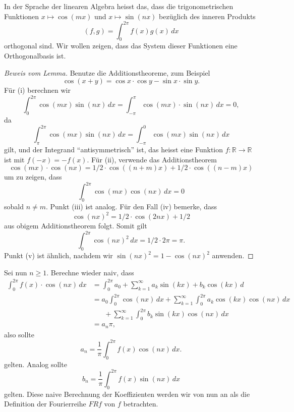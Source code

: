 \documentclass[../main.tex]{subfiles}
\begin{document}
In der Sprache der linearen Algebra 
heisst das, dass die trigonometrischen Funktionen
$x \mapsto \cos(mx)$ und $x \mapsto \sin(nx)$
bezüglich des inneren Produkts
\[
  (f, g) = \int_{0}^{2\pi} f(x) g(x) \, dx
\]
orthogonal sind.
Wir wollen zeigen, dass das System dieser Funktionen
eine Orthogonalbasis ist.

\begin{proof}[Beweis vom Lemma]
  Benutze die Additionstheoreme, zum Beispiel
  \[
    \cos(x + y) = \cos x \cdot \cos y - \sin x \cdot \sin y.
  \]
  Für (i) berechnen wir
  \[
    \int_{0}^{2\pi} \cos(mx) \sin(nx) \, dx
     = \int_{-\pi}^{\pi} \cos(mx) \cdot \sin(nx) \, dx = 0,
\]
  da
  \[
    \int_{\pi}^{2\pi} \cos(mx) \sin(nx) \, dx
    = \int_{-\pi}^{0} \cos(mx) \sin(nx) \, dx
  \]
  gilt, und der Integrand ``antisymmetrisch'' ist, das heisst eine
  Funktion $f \colon \mathbb{R} \to \mathbb{R}$ ist mit
  $f(-x) = -f(x)$.
  Für (ii), verwende das Additionstheorem 
  \[
    \cos(mx) \cdot \cos(nx) = 1/2 \cdot \cos((n+m)x) + 1/2 \cdot \cos ((n-m)x)
  \]
  um zu zeigen, dass
  \[
    \int_{0}^{2\pi} \cos(mx) \cos(nx) \, dx = 0
  \]
  sobald $n \neq m$. Punkt (iii) ist analog.
  Für den Fall (iv) bemerke, dass
  \[
    {\cos(nx)}^2 = 1/2 \cdot \cos(2nx) + 1/2
  \]
  aus obigem Additionstheorem folgt. Somit gilt
  \[
    \int_{0}^{2\pi} {\cos(nx)}^2 \, dx = 1/2 \cdot 2 \pi = \pi.
  \]
  Punkt (v) ist ähnlich, nachdem wir ${\sin(nx)}^2 = 1 - {\cos(nx)}^2$ anwenden.
\end{proof}

Sei nun $n \geq 1$.
Berechne wieder naiv, dass
\begin{align*}
  \int_{0}^{2\pi} f(x) \cdot \cos(nx) \, dx
  &= \int_{0}^{2\pi} a_0 + \sum_{k=1}^{\infty} a_k \sin(kx) + b_k \cos(kx) \, d  \\
  &= a_0 \int_{0}^{2\pi} \cos(nx) \, dx
  + \sum_{k=1}^{\infty} \int_{0}^{2\pi} a_k \cos(kx)\cos(nx) \, dx\\
  &\;\;\;\;\;\;  + \sum_{k=1}^{\infty} \int_{0}^{2\pi} b_k \sin(kx) \cos(nx) \, dx\\
  &= a_n \pi,
\end{align*}
also sollte
\[
  a_n = \frac{1}{\pi} \int_{0}^{2\pi} f(x) \cos(nx) \, dx.
\]
gelten.
Analog sollte
\[
  b_n = \frac{1}{\pi}\int_{0}^{2\pi} f(x) \sin(nx) \, dx
\]
gelten. Diese naive Berechnung der Koeffizienten werden wir von nun
an als die Definition der Fourierreihe $FRf$ von $f$ betrachten.
\end{document}
